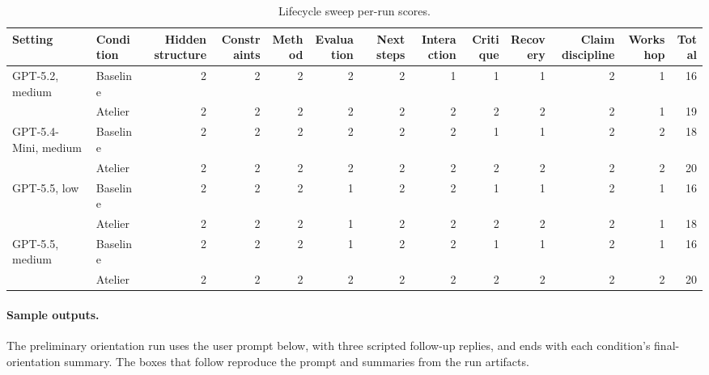 \begin{table}[t]
  \centering
  \scriptsize
  \setlength{\tabcolsep}{4pt}
  \begin{tabular}{@{}llrrrrrrrrrrr@{}}
    \toprule
    Setting & Condition & Hidden structure & Constraints & Method & Evaluation & Next steps & Interaction & Critique & Recovery & Claim discipline & Workshop & Total \\
    \midrule
    GPT-5.2, medium      & Baseline & 2 & 2 & 2 & 2 & 2 & 1 & 1 & 1 & 2 & 1 & 16 \\
                         & Atelier  & 2 & 2 & 2 & 2 & 2 & 2 & 2 & 2 & 2 & 1 & 19 \\
    GPT-5.4-Mini, medium & Baseline & 2 & 2 & 2 & 2 & 2 & 2 & 1 & 1 & 2 & 2 & 18 \\
                         & Atelier  & 2 & 2 & 2 & 2 & 2 & 2 & 2 & 2 & 2 & 2 & 20 \\
    GPT-5.5, low         & Baseline & 2 & 2 & 2 & 1 & 2 & 2 & 1 & 1 & 2 & 1 & 16 \\
                         & Atelier  & 2 & 2 & 2 & 1 & 2 & 2 & 2 & 2 & 2 & 1 & 18 \\
    GPT-5.5, medium      & Baseline & 2 & 2 & 2 & 1 & 2 & 2 & 1 & 1 & 2 & 1 & 16 \\
                         & Atelier  & 2 & 2 & 2 & 2 & 2 & 2 & 2 & 2 & 2 & 2 & 20 \\
    \bottomrule
  \end{tabular}
  \caption{Lifecycle sweep per-run scores.}
  \label{tab:lifecycle-per-run}
\end{table}

\paragraph{Sample outputs.}
The preliminary orientation run uses the user prompt below, with three scripted follow-up replies, and ends with each condition's final-orientation summary. The boxes that follow reproduce the prompt and summaries from the run artifacts.

